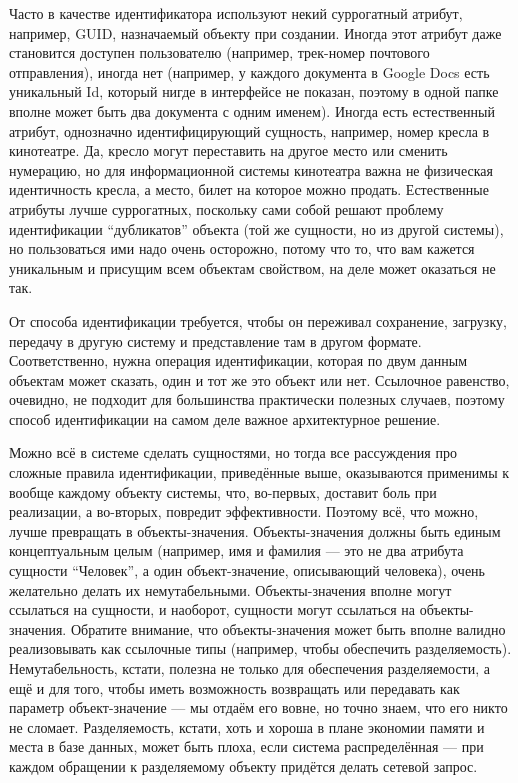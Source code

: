 \documentclass{../../text-style}
\begin{document}
Часто в качестве идентификатора используют некий суррогатный атрибут, например, GUID, назначаемый объекту при создании. Иногда этот атрибут даже становится доступен пользователю (например, трек-номер почтового отправления), иногда нет (например, у каждого документа в Google Docs есть уникальный Id, который нигде в интерфейсе не показан, поэтому в одной папке вполне может быть два документа с одним именем). Иногда есть естественный атрибут, однозначно идентифицирующий сущность, например, номер кресла в кинотеатре. Да, кресло могут переставить на другое место или сменить нумерацию, но для информационной системы кинотеатра важна не физическая идентичность кресла, а место, билет на которое можно продать. Естественные атрибуты лучше суррогатных, поскольку сами собой решают проблему идентификации ``дубликатов'' объекта (той же сущности, но из другой системы), но пользоваться ими надо очень осторожно, потому что то, что вам кажется уникальным и присущим всем объектам свойством, на деле может оказаться не так.

От способа идентификации требуется, чтобы он переживал сохранение, загрузку, передачу в другую систему и представление там в другом формате. Соответственно, нужна операция идентификации, которая по двум данным объектам может сказать, один и тот же это объект или нет. Ссылочное равенство, очевидно, не подходит для большинства практически полезных случаев, поэтому способ идентификации на самом деле важное архитектурное решение.

Можно всё в системе сделать сущностями, но тогда все рассуждения про сложные правила идентификации, приведённые выше, оказываются применимы к вообще каждому объекту системы, что, во-первых, доставит боль при реализации, а во-вторых, повредит эффективности. Поэтому всё, что можно, лучше превращать в объекты-значения. Объекты-значения должны быть единым концептуальным целым (например, имя и фамилия --- это не два атрибута сущности ``Человек'', а один объект-значение, описывающий человека), очень желательно делать их немутабельными. Объекты-значения вполне могут ссылаться на сущности, и наоборот, сущности могут ссылаться на объекты-значения. Обратите внимание, что объекты-значения может быть вполне валидно реализовывать как ссылочные типы (например, чтобы обеспечить разделяемость). Немутабельность, кстати, полезна не только для обеспечения разделяемости, а ещё и для того, чтобы иметь возможность возвращать или передавать как параметр объект-значение --- мы отдаём его вовне, но точно знаем, что его никто не сломает. Разделяемость, кстати, хоть и хороша в плане экономии памяти и места в базе данных, может быть плоха, если система распределённая --- при каждом обращении к разделяемому объекту придётся делать сетевой запрос.
\end{document}
